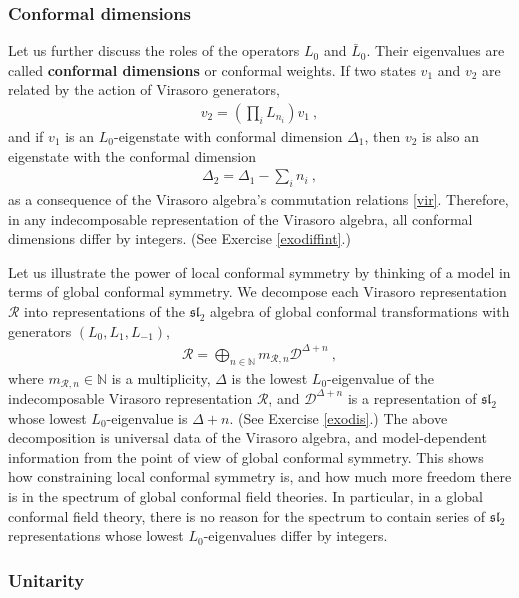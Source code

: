 \documentclass[12pt, a4paper, notitlepage, twoside]{report}
\numberwithin{equation}{section}
\theoremstyle{break}
\begin{document}
\subsubsection{Conformal dimensions}

Let us further discuss the roles of the operators $L_0$ and $\bar L_0$. Their eigenvalues are called \textbf{\boldmath conformal dimensions} or conformal weights. If 
two states $v_1$ and $v_2$ are related by the action of Virasoro generators,
\begin{align}
 v_2 = \left(\prod_i L_{n_i}\right) v_1\ ,
\label{vovt}
\end{align}
and if $v_1$ is an $L_0$-eigenstate with conformal dimension $\Delta_1$, then $v_2$ is also an eigenstate with the conformal dimension
\begin{align}
 \Delta_2 = \Delta_1 - \sum_i n_i\ ,
\label{ddsn}
\end{align}
as a consequence of the Virasoro algebra's commutation relations \eqref{vir}. Therefore, in any indecomposable representation of the Virasoro algebra, all conformal dimensions differ by integers. (See Exercise \ref{exodiffint}.)

Let us illustrate the power of local conformal symmetry by thinking of a model in terms of global conformal symmetry. 
We decompose each Virasoro representation $\mathcal{R}$ into representations of the $\mathfrak{sl}_2$ algebra of global conformal transformations with generators $(L_0,L_1,L_{-1})$,
\begin{align}
 \mathcal{R}=\bigoplus_{n\in{\mathbb{N}}} m_{\mathcal{R},n} \mathcal{D}^{\Delta+n}\ ,
\label{rbd}
\end{align}
where $m_{\mathcal{R},n}\in {\mathbb{N}}$ is a multiplicity, $\Delta$ is the lowest $L_0$-eigenvalue of the indecomposable Virasoro representation $\mathcal{R}$, and $\mathcal{D}^{\Delta+n}$ is a representation of $\mathfrak{sl}_2$ whose lowest $L_0$-eigenvalue is $\Delta+n$.
(See Exercise \ref{exodis}.)
The above decomposition is universal data of the Virasoro algebra, and 
model-dependent information from the point of view of global conformal symmetry.
This shows how constraining local conformal symmetry is, and how much more freedom there is in the spectrum of global conformal field theories.
In particular, in a global conformal field theory, there is no reason for the spectrum to contain series of
$\mathfrak{sl}_2$ representations whose lowest $L_0$-eigenvalues differ by integers. 

\subsubsection{Unitarity}
\end{document}
